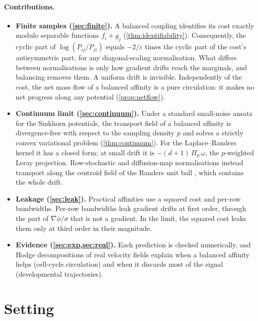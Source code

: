 \documentclass{article}
\theoremstyle{plain}
\theoremstyle{definition}
\theoremstyle{remark}
\newcommand{\eps}{\varepsilon}
\newcommand{\1}{\mathbf{1}}
\newcommand{\Leray}{\Pi}
\begin{document}
\paragraph{Contributions.}
\begin{itemize}
  \item \textbf{Finite samples (\cref{sec:finite}).} A balanced coupling
    identifies its cost exactly modulo separable functions $f_i+g_j$
    (\cref{thm:identifiability}). Consequently, the cyclic part of
    $\log(P_{ij}/P_{ji})$ equals $-2/\eps$ times the cyclic part of the
    cost's antisymmetric part, for any diagonal-scaling normalisation. What
    differs between normalisations is only how gradient drifts reach the
    marginals, and balancing removes them. A uniform drift is invisible.
    Independently of the cost, the net mass flow of a balanced affinity is
    a pure circulation: it makes no net progress along any potential
    (\cref{prop:netflow}).
  \item \textbf{Continuum limit (\cref{sec:continuum}).} Under a standard
    small-noise ansatz for the Sinkhorn potentials, the transport field of
    a balanced affinity is divergence-free with respect to the sampling
    density $p$ and solves a strictly convex variational problem
    (\cref{thm:continuum}). For the Laplace--Randers kernel it has a closed
    form; at small drift it is $-(d{+}1)\,\Leray_p\,\omega$, the
    $p$-weighted Leray projection. Row-stochastic and diffusion-map
    normalisations instead transport along the centroid field of the Randers
    unit ball \citep{debaussart2026finslerian}, which contains the whole
    drift.
  \item \textbf{Leakage (\cref{sec:leak}).} Practical affinities use a
    squared cost and per-row bandwidths. Per-row bandwidths leak gradient
    drifts at first order, through the part of $\nabla\phi/\sigma$ that is
    not a gradient. In the limit, the squared cost leaks them only at third
    order in their magnitude.
  \item \textbf{Evidence (\cref{sec:exp,sec:real}).} Each prediction is
    checked numerically, and Hodge decompositions of real velocity fields
    explain when a balanced affinity helps (cell-cycle circulation) and
    when it discards most of the signal (developmental trajectories).
\end{itemize}

\section{Setting}
\label{sec:setting}
\end{document}
